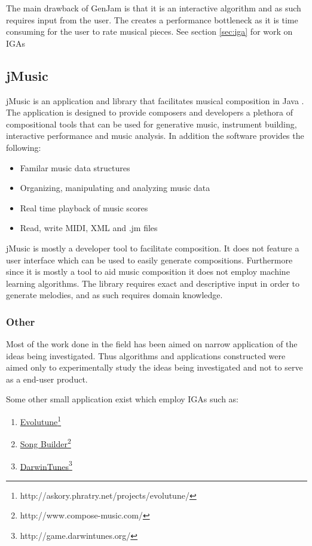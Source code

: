 The main drawback of GenJam is that it is an interactive algorithm and as such requires input from the user. The creates a performance bottleneck as it is time consuming for the user to rate musical pieces.
See section \ref{sec:iga} for work on \acsp{IGA}

\subsection{jMusic}
jMusic is an application and library that facilitates musical composition in Java \cite{Sorensen}. The application is designed to provide composers and developers a plethora of compositional tools that can be used for generative music, instrument building, interactive performance and music analysis. In addition the software provides the following:
\begin{itemize}
\item Familar music data structures
\item Organizing, manipulating and analyzing music data
\item Real time playback of music scores
\item Read, write \ac{MIDI}, \ac{XML} and .jm files
\end{itemize}

jMusic is mostly a developer tool to facilitate composition. It does not feature a user interface which can be used to easily generate compositions. Furthermore since it is mostly a tool to aid music composition it does not employ machine learning algorithms. The library requires exact and descriptive input in order to generate melodies, and as such requires domain knowledge.

\subsubsection{Other}
Most of the work done in the field has been aimed on narrow application of the ideas being investigated. Thus algorithms and applications constructed were aimed only to experimentally study the ideas being investigated and not to serve as a end-user product. 

Some other small application exist which employ \acp{IGA} such as:
\begin{enumerate}
\item \href{http://askory.phratry.net/projects/evolutune/}{Evolutune}\footnote{http://askory.phratry.net/projects/evolutune/}
\item \href{http://www.compose-music.com/}{Song Builder}\footnote{http://www.compose-music.com/}
\item \href{http://game.darwintunes.org/}{DarwinTunes}\footnote{http://game.darwintunes.org/}
\end{enumerate}

